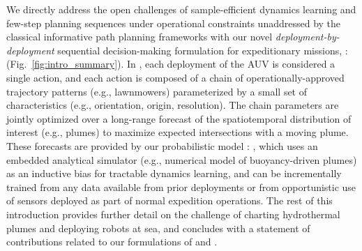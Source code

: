 We directly address the open challenges of sample-efficient dynamics learning and few-step planning sequences under operational constraints unaddressed by the classical informative path planning frameworks with our novel \emph{deployment-by-deployment} sequential decision-making formulation for expeditionary missions, \PHORTEX: \phortex (Fig.~\ref{fig:intro_summary}). In \PHORTEX, each deployment of the AUV is considered a single action, and each action is composed of a chain of operationally-approved trajectory patterns (e.g., lawnmowers) parameterized by a small set of characteristics (e.g., orientation, origin, resolution). The chain parameters are jointly optimized over a long-range forecast of the spatiotemporal distribution of interest (e.g., plumes) to maximize expected intersections with a moving plume. These forecasts are provided by our probabilistic model \PHUMES: \phumes, which uses an embedded analytical simulator (e.g., numerical model of buoyancy-driven plumes) as an inductive bias for tractable dynamics learning, and can be incrementally trained from any data available from prior deployments or from opportunistic use of sensors deployed as part of normal expedition operations. The rest of this introduction provides further detail on the challenge of charting hydrothermal plumes and deploying robots at sea, and concludes with a statement of contributions related to our formulations of \PHORTEX and \PHUMES. 

